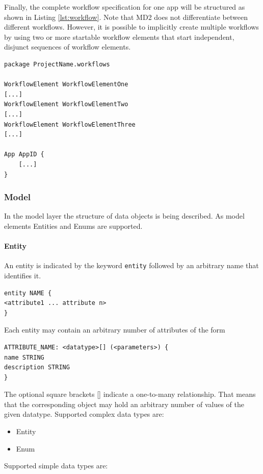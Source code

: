 Finally, the complete workflow specification for one app will be structured as shown in Listing \ref{lst:workflow}. Note that MD2 does not differentiate between different workflows. However, it is possible to implicitly create multiple workflows by using two or more startable workflow elements that start independent, disjunct sequences of workflow elements.

\begin{lstlisting}[language=MD2, label=lst:workflow, caption=Workflow Definition in MD2]
package ProjectName.workflows

WorkflowElement WorkflowElementOne
[...]
WorkflowElement WorkflowElementTwo
[...]
WorkflowElement WorkflowElementThree
[...]

App AppID {
	[...]
}
\end{lstlisting}

\subsubsection{Model} 
\label{subsubsec:Model}

In the model layer the structure of data objects is being described. As model elements Entities and Enums are supported.
\paragraph{Entity}
An entity is indicated by the keyword {\lstinline!entity!} followed by an arbitrary name that identifies it.
\begin{lstlisting}
entity NAME {
<attribute1 ... attribute n>
}
\end{lstlisting}
Each entity may contain an arbitrary number of attributes of the form
\begin{lstlisting}
ATTRIBUTE_NAME: <datatype>[] (<parameters>) {
name STRING
description STRING
}
\end{lstlisting}
The optional square brackets [] indicate a one-to-many relationship. That means that the corresponding object may hold an arbitrary number of values of the given datatype.
Supported complex data types are:
\begin{itemize}
\item{Entity}
\item{Enum}
\end{itemize}
Supported simple data types are:


